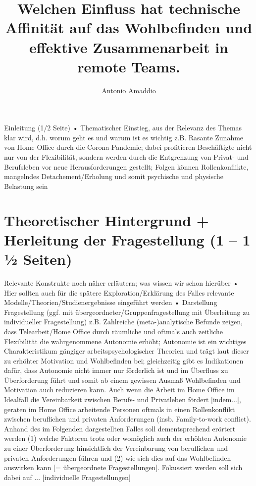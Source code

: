 \documentclass[man]{apa7}
\title{Welchen Einfluss hat technische Affinität auf das Wohlbefinden und effektive Zusammenarbeit in remote Teams.}
\author{Antonio Amaddio}
\affiliation{Freie Universität Berlin \\ A\&amp;O Vertiefung, Winter 2022/23, Supervisor: Dr. Lisa Handke}
\begin{document}
\maketitle
Einleitung (1/2 Seite)
• Thematischer Einstieg, aus der Relevanz des Themas klar wird, d.h. worum geht es und
warum ist es wichtig
z.B. Rasante Zunahme von Home Office durch die Corona-Pandemie; dabei profitieren Beschäftigte nicht nur von der Flexibilität, sondern werden durch die Entgrenzung von Privat- und Berufsleben vor neue Herausforderungen gestellt; Folgen können Rollenkonflikte, mangelndes Detachement/Erholung und somit psychische und physische Belastung sein

\section{Theoretischer Hintergrund + Herleitung der Fragestellung (1 – 1 1⁄2 Seiten)}

Relevante Konstrukte noch näher erläutern; was wissen wir schon hierüber
• Hier sollten auch für die spätere Exploration/Erklärung des Falles relevante
Modelle/Theorien/Studienergebnisse eingeführt werden
• Darstellung Fragestellung (ggf. mit übergeordneter/Gruppenfragestellung mit Überleitung zu
individueller Fragestellung)
z.B. Zahlreiche (meta-)analytische Befunde zeigen, dass Telearbeit/Home Office durch räumliche und oftmals auch zeitliche Flexibilität die wahrgenommene Autonomie erhöht; Autonomie ist ein wichtiges Charakteristikum gängiger arbeitspsychologischer Theorien und trägt laut dieser zu erhöhter Motivation und Wohlbefinden bei; gleichzeitig gibt es Indikationen dafür, dass Autonomie nicht immer nur förderlich ist und im Überfluss zu Überforderung führt und somit ab einem gewissen Ausmaß Wohlbefinden und Motivation auch reduzieren kann.
Auch wenn die Arbeit im Home Office im Idealfall die Vereinbarkeit zwischen Berufs- und Privatleben fördert [indem...], geraten im Home Office arbeitende Personen oftmals in einen Rollenkonflikt zwischen beruflichen und privaten Anforderungen (insb. Family-to-work conflict). Anhand des im Folgenden dargestellten Falles soll dementsprechend erörtert werden (1) welche Faktoren trotz oder womöglich auch der erhöhten Autonomie zu einer Überforderung hinsichtlich der Vereinbarung von beruflichen und privaten Anforderungen führen und (2) wie sich dies auf das Wohlbefinden auswirken kann [= übergeordnete Fragestellungen]. Fokussiert werden soll sich dabei auf ... [individuelle Fragestellungen]
\end{document}
